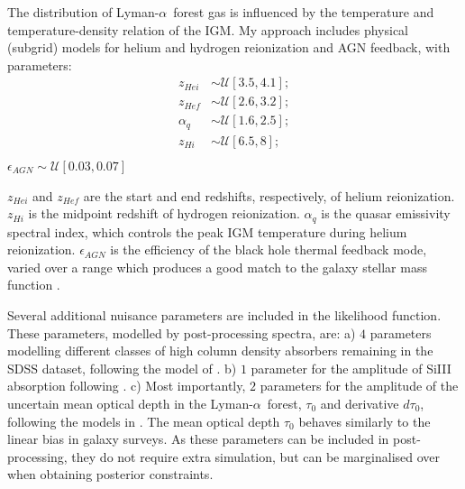 \documentclass[a4paper,11pt]{article}
\newcommand{\Lya}{Lyman-$\alpha$}
\newcommand{\uniform}{\mathcal{U}}
\begin{document}
The distribution of \Lya~forest gas is influenced by the temperature and temperature-density relation of the IGM. My approach includes physical (subgrid) models for helium and hydrogen reionization and AGN feedback, with parameters:
\begin{align}
      z_{Hei}        &\sim \uniform[3.5, 4.1]; \\
      z_{Hef}        &\sim \uniform[2.6, 3.2]; \\
      \alpha_q      &\sim \uniform[1.6, 2.5]; \\
      z_{Hi}        &\sim \uniform[6.5, 8]; \\
   \label{eq:prior_reion_volume}
\end{align}
$\epsilon_{AGN} \sim \uniform[0.03, 0.07]$

$z_{Hei}$ and $z_{Hef}$ are the start and end redshifts, respectively, of helium reionization. $z_{Hi}$ is the midpoint redshift of hydrogen reionization. $\alpha_q$ is the quasar emissivity spectral index, which controls the peak IGM temperature during helium reionization. $\epsilon_{AGN}$ is the efficiency of the black hole thermal feedback mode, varied over a range which produces a good match to the galaxy stellar mass function \cite{Ni:2021}.

Several additional nuisance parameters are included in the likelihood function. These parameters, modelled by post-processing spectra, are: a) $4$ parameters modelling different classes of high column density absorbers remaining in the SDSS dataset, following the model of \cite{Rogers:2017}. b) $1$ parameter for the amplitude of SiIII absorption following \cite{McDonald:2004data}. c) Most importantly, $2$ parameters for the amplitude of the uncertain mean optical depth in the \Lya~forest, $\tau_0$ and derivative $d\tau_0$, following the models in \cite{Viel:2006, Bird:2019}. The mean optical depth $\tau_0$ behaves similarly to the linear bias in galaxy surveys. As these parameters can be included in post-processing, they do not require extra simulation, but can be marginalised over when obtaining posterior constraints.
\end{document}
